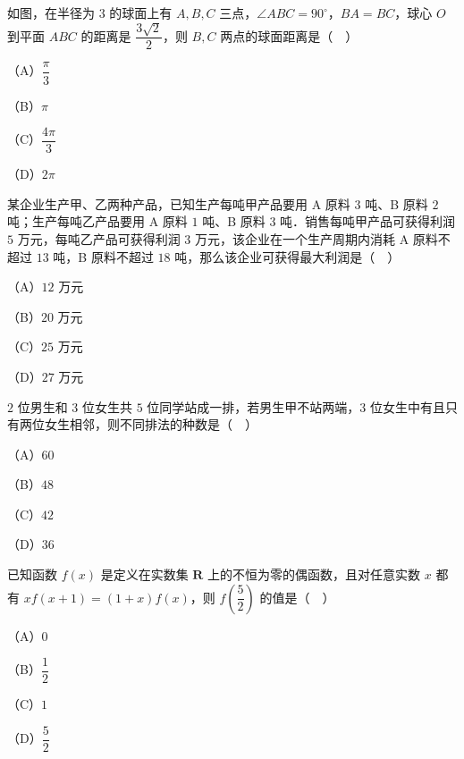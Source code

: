 \begin{question}
如图，在半径为 $3$ 的球面上有 $A,B,C$ 三点，$\angle ABC=90^\circ$，$BA=BC$，球心 $O$ 到平面 $ABC$ 的距离是 $\dfrac{3\sqrt2}{2}$，则 $B,C$ 两点的球面距离是（　）
\nopagebreak[4]
\begin{center}\end{center}
\nopagebreak[4]
（A）$\dfrac{\pi}{3}$

（B）$\pi$

（C）$\dfrac{4\pi}{3}$

（D）$2\pi$

\end{question}
\begin{question}
某企业生产甲、乙两种产品，已知生产每吨甲产品要用 A 原料 $3$ 吨、B 原料 $2$ 吨；生产每吨乙产品要用 A 原料 $1$ 吨、B 原料 $3$ 吨．销售每吨甲产品可获得利润 $5$ 万元，每吨乙产品可获得利润 $3$ 万元，该企业在一个生产周期内消耗 A 原料不超过 $13$ 吨，B 原料不超过 $18$ 吨，那么该企业可获得最大利润是（　）

（A）$12$ 万元

（B）$20$ 万元

（C）$25$ 万元

（D）$27$ 万元

\end{question}
\begin{question}
$2$ 位男生和 $3$ 位女生共 $5$ 位同学站成一排，若男生甲不站两端，$3$ 位女生中有且只有两位女生相邻，则不同排法的种数是（　）

（A）$60$

（B）$48$

（C）$42$

（D）$36$

\end{question}
\begin{question}
已知函数 $f(x)$ 是定义在实数集 $\mathbf R$ 上的不恒为零的偶函数，且对任意实数 $x$ 都有 $xf(x+1)=(1+x)f(x)$，则 $f\left(\dfrac52\right)$ 的值是（　）

（A）$0$

（B）$\dfrac12$

（C）$1$

（D）$\dfrac52$

\end{question}

